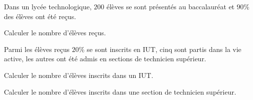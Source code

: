 \documentclass[a4paper,10pt]{book}        %
\begin{document}
	Dans un lycée technologique, $200$ élèves se sont présentés
	au baccalauréat et $90 \%$ des élèves ont été reçus.\\
	\begin{enumMet}
		\item Calculer le nombre d'élèves reçus.
		\item Parmi les élèves reçus $20 \%$ se sont inscrits en IUT, cinq sont partis dans la vie active, les autres ont été admis en sections de technicien supérieur.
		\begin{enumMet}
			\item Calculer le nombre d'élèves inscrits dans un IUT.\\
			\item Calculer le nombre d'élèves inscrits dans une section de technicien supérieur.
		\end{enumMet}
	\end{enumMet}

\ \\
\end{document}
